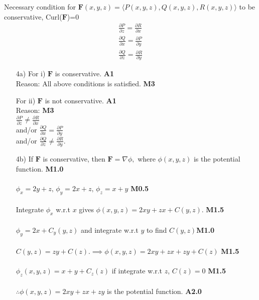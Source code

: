 \documentclass[12pt]{exam}
\newcommand{\vF}{\mathbf{F}}
\begin{document}
\begin{questions}
\begin{solution}
	Necessary condition for $\vF(x,y,z)=\langle P(x,y,z), Q(x, y, z), R(x, y, z)\rangle$ to be conservative, Curl($\vF$)=0 
	\begin{align*}
	\frac{\partial P}{\partial z}=\frac{\partial R}{\partial x} \\
	\frac{\partial Q}{\partial x} =\frac{\partial P}{\partial y} \\
	\frac{\partial Q}{\partial z} =\frac{\partial R}{\partial y}
	\end{align*}
	\begin{enumerate}
		\item[4a)] For i) $\vF$ is conservative. \hfill \textbf{A1}\\
					Reason: All above conditions is satisfied. \hfill \textbf{M3}
		\item[ ]	For ii) $\vF$ is not conservative. \hfill \textbf{A1}\\
					Reason: \hfill \textbf{M3}\\
					$\frac{\partial P}{\partial z}\neq\frac{\partial R}{\partial x}$\\
					and/or $\frac{\partial Q}{\partial x} =\frac{\partial P}{\partial y}$\\
					and/or $\frac{\partial Q}{\partial z} \neq \frac{\partial R}{\partial y}.$
					
		\item[4b)] If $\vF$ is conservative, then $\vF=\nabla\phi,$ where $\phi(x,y,z)$ is the potential function. \hfill \textbf{M1.0}\\ \\
		$\phi_x=2y+z, \, \phi_y=2x+z, \, \phi_z=x+y$ \hfill \textbf{M0.5}\\ \\
		Integrate $\phi_x$ w.r.t $x$ gives $\phi(x,y,z)=2xy+zx+C(y,z).$ \hfill \textbf{M1.5}\\ \\
		$\phi_y=2x+C_y(y,z)$ and integrate w.r.t $y$ to find $C(y,z)$\hfill \textbf{M1.0}\\ \\
		$C(y,z)=zy+C(z).\implies\phi(x,y,z)=2xy+zx + zy+C(z)$ \hfill \textbf{M1.5}\\ \\
		$\phi_z(x,y,z)=x+y+C_z(z)$ if integrate w.r.t $z$, $C(z)=0$ \hfill \textbf{M1.5}\\ \\
		$\therefore \phi(x,y,z)=2xy+zx + zy$ is the potential function. \hfill \textbf{A2.0} 
					

\end{enumerate}
\end{solution}
\end{questions}
\end{document}
